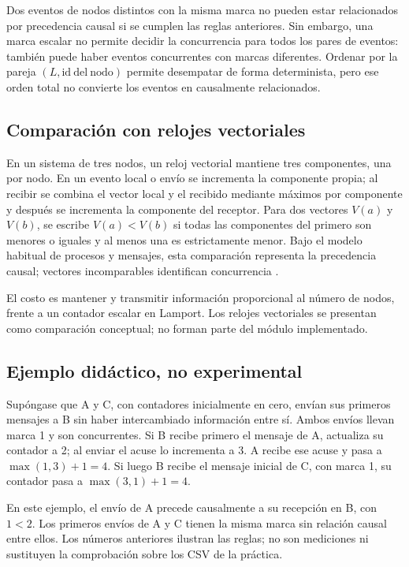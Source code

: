 Dos eventos de nodos distintos con la misma marca no pueden estar relacionados
por precedencia causal si se cumplen las reglas anteriores. Sin embargo, una
marca escalar no permite decidir la concurrencia para todos los pares de eventos:
también puede haber eventos concurrentes con marcas diferentes. Ordenar por
la pareja $(L,\mathrm{id\ del\ nodo})$ permite desempatar de forma determinista,
pero ese orden total no convierte los eventos en causalmente relacionados.

\subsection{Comparación con relojes vectoriales}
En un sistema de tres nodos, un reloj vectorial mantiene tres componentes,
una por nodo. En un evento local o envío se incrementa la componente propia;
al recibir se combina el vector local y el recibido mediante máximos por
componente y después se incrementa la componente del receptor.
Para dos vectores $V(a)$ y $V(b)$, se escribe $V(a)<V(b)$ si todas las
componentes del primero son menores o iguales y al menos una es estrictamente
menor. Bajo el modelo habitual de procesos y mensajes, esta comparación
representa la precedencia causal; vectores incomparables identifican
concurrencia \cite{vanSteenTanenbaum2023}.

El costo es mantener y transmitir información proporcional al número de nodos,
frente a un contador escalar en Lamport. Los relojes vectoriales se presentan
como comparación conceptual; no forman parte del módulo implementado.

\subsection{Ejemplo didáctico, no experimental}
Supóngase que A y C, con contadores inicialmente en cero, envían sus primeros
mensajes a B sin haber intercambiado información entre sí. Ambos envíos llevan
marca 1 y son concurrentes. Si B recibe primero el mensaje de A, actualiza su
contador a 2; al enviar el acuse lo incrementa a 3. A recibe ese acuse y pasa
a $\max(1,3)+1=4$. Si luego B recibe el mensaje inicial de C, con marca 1,
su contador pasa a $\max(3,1)+1=4$.

En este ejemplo, el envío de A precede causalmente a su recepción en B,
con $1<2$. Los primeros envíos de A y C tienen la misma marca sin relación
causal entre ellos. Los números anteriores ilustran las reglas; no son
mediciones ni sustituyen la comprobación sobre los CSV de la práctica.
